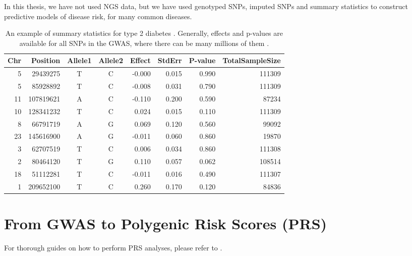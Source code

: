 In this thesis, we have not used NGS data, but we have used genotyped SNPs, imputed SNPs and summary statistics to construct predictive models of disease risk, for many common diseases.

\begin{table}[ht]
\caption{An example of summary statistics for type 2 diabetes \cite[]{scott2017expanded}. Generally, effects and p-values are available for all SNPs in the GWAS, where there can be many millions of them \cite[]{asking4more}.}\label{tab:sumstats}
\vspace{0.5em}
\centering
\begin{tabular}{rrccrrrr}
  \hline
Chr & Position & Allele1 & Allele2 & Effect & StdErr & P-value & TotalSampleSize \\ 
  \hline
   5 & 29439275 & T & C & -0.000 & 0.015 & 0.990 & 111309 \\ 
     5 & 85928892 & T & C & -0.008 & 0.031 & 0.790 & 111309 \\ 
    11 & 107819621 & A & C & -0.110 & 0.200 & 0.590 & 87234 \\ 
    10 & 128341232 & T & C & 0.024 & 0.015 & 0.110 & 111309 \\ 
     8 & 66791719 & A & G & 0.069 & 0.120 & 0.560 & 99092 \\ 
    23 & 145616900 & A & G & -0.011 & 0.060 & 0.860 & 19870 \\ 
     3 & 62707519 & T & C & 0.006 & 0.034 & 0.860 & 111308 \\ 
     2 & 80464120 & T & G & 0.110 & 0.057 & 0.062 & 108514 \\ 
    18 & 51112281 & T & C & -0.011 & 0.016 & 0.490 & 111307 \\ 
     1 & 209652100 & T & C & 0.260 & 0.170 & 0.120 & 84836 \\ 
   \hline
\end{tabular}
\end{table}




\section{From GWAS to Polygenic Risk Scores (PRS)}

For thorough guides on how to perform PRS analyses, please refer to \cite{wray2014research,chasioti2019progress,choi2018guide}.

